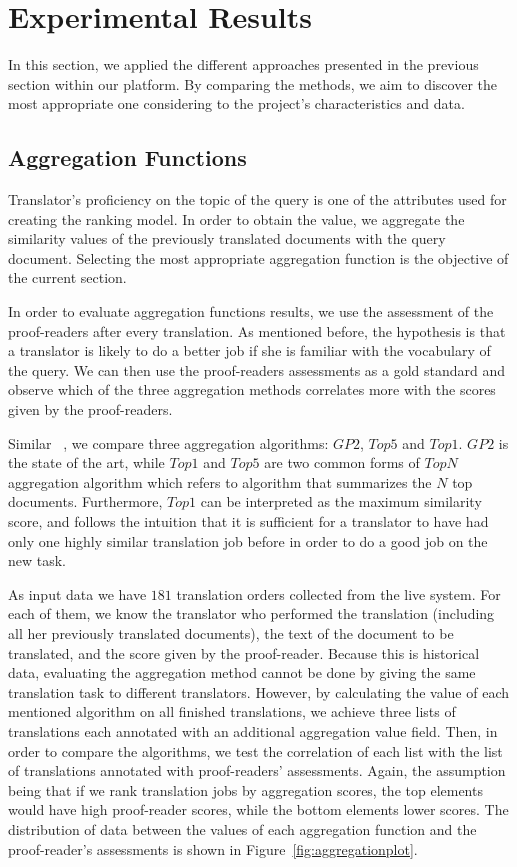 \section{Experimental Results}
\label{sec:apply}
In this section, we applied the different approaches presented in the previous section within our platform. By comparing the methods, we aim to discover the most appropriate one considering to the project's characteristics and data. 

\subsection{Aggregation Functions}
Translator's proficiency on the topic of the query is one of the attributes used for creating the ranking model. In order to obtain the value, we aggregate the similarity values of the previously translated documents with the query document. Selecting the most appropriate aggregation function is the objective of the current section.

In order to evaluate aggregation functions results, we use the assessment of the proof-readers after every translation. As mentioned before, the hypothesis is that a translator is likely to do a better job if she is familiar with the vocabulary of the query. We can then use the proof-readers assessments as a gold standard and observe which of the three aggregation methods correlates more with the scores given by the proof-readers. 

Similar ~\cite{agg-gp2}, we compare three aggregation algorithms: $GP2$, $Top5$ and $Top1$. $GP2$ is the state of the art, while $Top1$ and $Top5$ are two common forms of $TopN$ aggregation algorithm which refers to algorithm that summarizes the $N$ top documents. Furthermore, $Top1$ can be interpreted as the maximum similarity score, and follows the intuition that it is sufficient for a translator to have had only one highly similar translation job before in order to do a good job on the new task.

As input data we have $181$ translation orders collected from the live system. For each of them, we know the translator who performed the translation (including all her previously translated documents), the text of the document to be translated, and the score given by the proof-reader. Because this is historical data, evaluating the aggregation method cannot be done by giving the same translation task to different translators. However, by calculating the value of each mentioned algorithm on all finished translations, we achieve three lists of translations each annotated with an additional aggregation value field. Then, in order to compare the algorithms, we test the correlation of each list with the list of translations annotated with proof-readers' assessments. Again, the assumption being that if we rank translation jobs by aggregation scores, the top elements would have high proof-reader scores, while the bottom elements lower scores. The distribution of data between the values of each aggregation function and the proof-reader's assessments is shown in Figure~\ref{fig:aggregationplot}.

